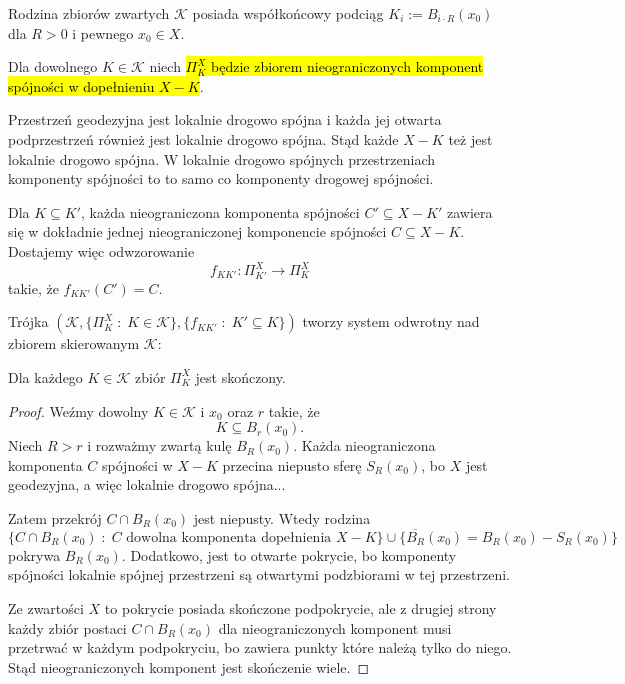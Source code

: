 \begin{example}
Rodzina zbiorów zwartych $\mathcal{K}$ posiada współkońcowy podciąg $K_i:=B_{i\cdot R}(x_0)$ dla $R>0$ i pewnego $x_0\in X$.
  \end{example}
    
Dla dowolnego $K\in\mathcal{K}$ niech \hl{$\Pi_K^X$ będzie zbiorem nieograniczonych komponent spójności w dopełnieniu $X-K$}.

Przestrzeń geodezyjna jest lokalnie drogowo spójna i każda jej otwarta podprzestrzeń również jest lokalnie drogowo spójna. Stąd każde $X-K$ też jest lokalnie drogowo spójna. W lokalnie drogowo spójnych przestrzeniach komponenty spójności to to samo co komponenty drogowej spójności.\medskip

Dla $K\subseteq K'$, każda nieograniczona komponenta spójności $C'\subseteq X-K'$ zawiera się w dokładnie jednej nieograniczonej komponencie spójności $C\subseteq X-K$. Dostajemy więc odwzorowanie 
$$f_{KK'}:\Pi_{K'}^X\to \Pi_K^X$$
takie, że $f_{KK'}(C')=C$. 

Trójka $(\mathcal{K}, \{\Pi_K^X\;:\;K\in\mathcal{K}\},\{f_{KK'}\;:\;K'\subseteq K\})$ tworzy system odwrotny nad zbiorem skierowanym $\mathcal{K}$:
\begin{center}
\end{center}

\begin{fact}{}{}
  Dla każdego $K\in\mathcal{K}$ zbiór $\Pi_K^X$ jest skończony.
\end{fact}

\begin{proof}
  Weźmy dowolny $K\in\mathcal{K}$ i $x_0$ oraz $r$ takie, że 
  $$K\subseteq B_r(x_0).$$ 
  Niech $R>r$ i rozważmy zwartą kulę $B_R(x_0)$. Każda nieograniczona komponenta $C$ spójności w $X-K$ przecina niepusto sferę $S_R(x_0)$, bo $X$ jest geodezyjna, a więc lokalnie drogowo spójna...

  Zatem przekrój $C\cap B_R(x_0)$ jest niepusty. Wtedy rodzina 
  $$\{C\cap B_R(x_0)\;:\;C\text{ dowolna komponenta dopełnienia }X-K\}\cup \{\overline{B_R}(x_0)=B_R(x_0)-S_R(x_0)\}$$
  pokrywa $B_R(x_0)$. Dodatkowo, jest to otwarte pokrycie, bo komponenty spójności lokalnie spójnej przestrzeni są otwartymi podzbiorami w tej przestrzeni. 

  Ze zwartości $X$ to pokrycie posiada skończone podpokrycie, ale z drugiej strony każdy zbiór postaci $C\cap B_R(x_0)$ dla nieograniczonych komponent musi przetrwać w każdym podpokryciu, bo zawiera punkty które należą tylko do niego. Stąd nieograniczonych komponent jest skończenie wiele.
\end{proof}

